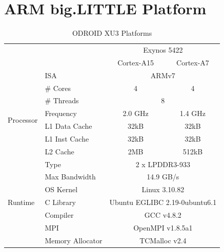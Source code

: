 \documentclass[11pt]{book}
\begin{document}
\chapter{ARM big.LITTLE Platform}\label{big_little_platform}

\pagebreak

\begin{table}
    \centering
    \begin{tabular}{|| l | l | c c ||}
    \hline
        \multicolumn{2}{|l|}{} & \multicolumn{2}{c||}{Exynos 5422} \\ \cline{3-4}
        \multicolumn{2}{|l|}{} & Cortex-A15 & Cortex-A7 \\ [0.5ex]
        \hline\hline
        \multirow{8}{*}{Processor}
            & ISA           & \multicolumn{2}{c||}{ARMv7} \\
            & \# Cores      & 4         & 4 \\
            & \# Threads    & \multicolumn{2}{c||}{8} \\
            & Frequency     & 2.0 GHz   & 1.4 GHz \\
            & L1 Data Cache & 32kB      & 32kB \\
            & L1 Inst Cache & 32kB      & 32kB \\
            & L2 Cache      & 2MB       & 512kB\\
        \hline
        \multirow{2}{*}{Memory}
            & Type          & \multicolumn{2}{c||}{2 x LPDDR3-933}  \\
            & Max Bandwidth & \multicolumn{2}{c||}{14.9 GB/s}       \\
        \hline
        \multirow{3}{*}{Runtime}
            & OS Kernel         & \multicolumn{2}{c||}{Linux 3.10.82}                   \\
            & C Library         & \multicolumn{2}{c||}{Ubuntu EGLIBC 2.19-0ubuntu6.1}   \\
            & Compiler          & \multicolumn{2}{c||}{GCC v4.8.2}                      \\
            & MPI               & \multicolumn{2}{c||}{OpenMPI v1.8.5a1}                \\
            & Memory Allocator  & \multicolumn{2}{c||}{TCMalloc v2.4}                   \\
        \hline
    \end{tabular}
    \caption{ODROID XU3 Platforms}\label{odroid_platform}
\end{table}
\end{document}
